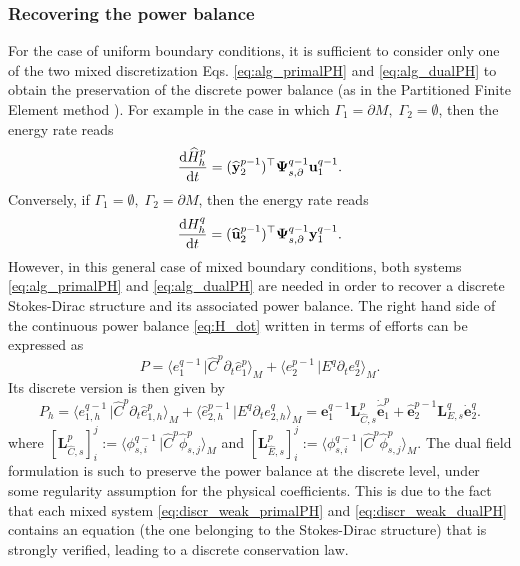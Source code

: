 \documentclass{elsarticle}
\newcommand{\revOne}[1]{{\color{black}#1}}
\newcommand{\revTwo}[1]{{\color{black}#1}}
\newcommand*{\dual}[1]{\ensuremath{\widehat{#1}}}
\newcommand{\dualpr}[3][]{\ensuremath{\langle #2 \, \vert #3 \rangle_{#1}}}
\begin{document}
\subsubsection{Recovering the power balance}
\revTwo{For the case of uniform boundary conditions, it is sufficient to consider only one of the two mixed discretization Eqs. \eqref{eq:alg_primalPH} and \eqref{eq:alg_dualPH} to obtain the preservation of the discrete power balance (as in the Partitioned Finite Element method \cite{cardoso2020pfem}). For example in the case in which $\Gamma_1 =\partial M, \; \Gamma_2 = \emptyset$, then the energy rate reads
\begin{equation}
    \diff{\dual{H}_h^p}{t} = (\dual{\mathbf{y}}^{p-1}_2)^\top\mathbf{\Psi}^{q-1}_{s, \partial} \mathbf{u}^{q-1}_1.
\end{equation}
Conversely, if $\Gamma_1 =\emptyset, \; \Gamma_2 = \partial M$, then the energy rate reads
\begin{equation}
    \diff{{H}_h^q}{t} = (\dual{\mathbf{u}}^{p-1}_2)^\top \mathbf{\Psi}^{q-1}_{s, \partial} \mathbf{y}^{q-1}_1.
\end{equation}
However, in this general case of mixed boundary conditions, both systems \eqref{eq:alg_primalPH} and \eqref{eq:alg_dualPH} are needed in order to recover a discrete Stokes-Dirac structure and its associated power balance.
}
\revOne{The right hand side of the continuous power balance} \eqref{eq:H_dot} written in terms of efforts can be expressed as
\begin{equation}
    P = \dualpr[M]{e^{q-1}_1}{\dual{C}^p\partial_t \dual{e}^p_1} + \dualpr[M]{\dual{e}^{p-1}_2}{E^q\partial_t e^q_2}.
\end{equation}
Its discrete version is then given by 
\begin{equation}
    P_h = \dualpr[M]{e^{q-1}_{1, h}}{\dual{C}^p\partial_t \dual{e}^p_{1, h}} + \dualpr[M]{\dual{e}^{p-1}_{2, h}}{E^q\partial_t e^q_{2, h}} = \mathbf{e}^{q-1}_1 \mathbf{L}_{\dual{C},s}^p \dot{\dual{\mathbf{e}}}^p_1 + \dual{\mathbf{e}}^{p-1}_2 \mathbf{L}_{E,s}^q \dot{{\mathbf{e}}}^q_2.
\end{equation}
where $[\mathbf{L}_{\dual{C}, s}^p]_{i}^j := \dualpr[M]{\phi^{q-1}_{s, i}}{\dual{C}^p \dual{\phi}^p_{s, j}}$ and $[\mathbf{L}_{\dual{E}, s}^p]_{i}^j := \dualpr[M]{\phi^{q-1}_{s, i}}{\dual{C}^p \dual{\phi}^p_{s, j}}$. The dual field formulation is such to preserve the power balance at the discrete level, under some regularity assumption for the physical coefficients. This is due to the fact that each mixed system \eqref{eq:discr_weak_primalPH} and \eqref{eq:discr_weak_dualPH} contains an equation (the one belonging to the Stokes-Dirac structure) that is strongly verified, leading to a discrete conservation law.
\end{document}
